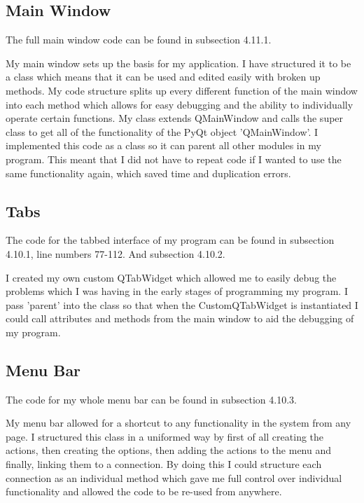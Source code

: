 \subsection{Main Window}

The full main window code can be found in subsection 4.11.1.


My main window sets up the basis for my application. I have structured it to be a class which means that it can be used and edited easily with broken up methods. My code structure splits up every different function of the main window into each method which allows for easy debugging and the ability to individually operate certain functions. My class extends QMainWindow and calls the super class to get all of the functionality of the PyQt object 'QMainWindow'. I implemented this code as a class so it can parent all other modules in my program. This meant that I did not have to repeat code if I wanted to use the same functionality again, which saved time and duplication errors.


\subsection{Tabs}

The code for the tabbed interface of my program can be  found in subsection 4.10.1, line numbers 77-112. And subsection 4.10.2.


I created my own custom QTabWidget which allowed me to easily debug the problems which I was having in the early stages of programming my program. I pass 'parent' into the class so that when the CustomQTabWidget is instantiated I could call attributes and methods from the main window to aid the debugging of my program.


\subsection{Menu Bar}

The code for my whole menu bar can be found in subsection 4.10.3.



My menu bar allowed for a shortcut to any functionality in the system from any page. I structured this class in a uniformed way by first of all creating the actions, then creating the options, then adding the actions to the menu and finally, linking them to a connection. By doing this I could structure each connection as an individual method which gave me full control over individual functionality and allowed the code to be re-used from anywhere.

